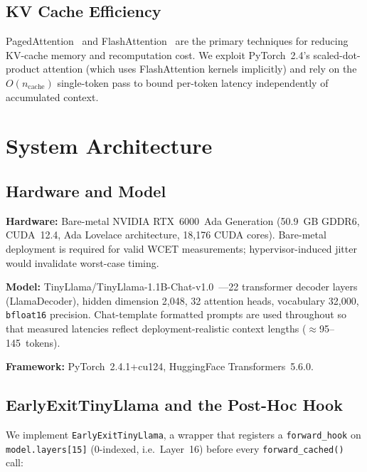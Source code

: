 \documentclass[conference]{IEEEtran}
\begin{document}
\subsection{KV Cache Efficiency}

PagedAttention~\cite{kwon2023efficient} and FlashAttention~\cite{dao2022flashattention,
dao2023flashattention2} are the primary techniques for reducing KV-cache
memory and recomputation cost.
We exploit PyTorch~2.4's scaled-dot-product attention (which uses
FlashAttention kernels implicitly) and rely on the $O(n_{\text{cache}})$
single-token pass to bound per-token latency independently of
accumulated context.

\section{System Architecture}

\subsection{Hardware and Model}

\textbf{Hardware:}
Bare-metal NVIDIA RTX~6000~Ada Generation (50.9~GB GDDR6, CUDA~12.4,
Ada Lovelace architecture, 18{,}176 CUDA cores).
Bare-metal deployment is required for valid WCET measurements;
hypervisor-induced jitter would invalidate worst-case timing.

\smallskip\noindent\textbf{Model:}
TinyLlama/TinyLlama-1.1B-Chat-v1.0~\cite{zhang2024tinyllama}---22
transformer decoder layers (LlamaDecoder), hidden dimension 2{,}048,
32 attention heads, vocabulary 32{,}000, \texttt{bfloat16} precision.
Chat-template formatted prompts are used throughout so that measured
latencies reflect deployment-realistic context lengths
($\approx$95--145~tokens).

\smallskip\noindent\textbf{Framework:}
PyTorch~2.4.1+cu124, HuggingFace Transformers~5.6.0.

\subsection{EarlyExitTinyLlama and the Post-Hoc Hook}

We implement \texttt{EarlyExitTinyLlama}, a wrapper that registers a
\texttt{forward\_hook} on \texttt{model.layers[15]} (0-indexed, i.e.\
Layer~16) before every \texttt{forward\_cached()} call:
\end{document}
